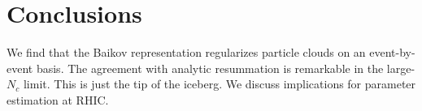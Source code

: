 \section{Conclusions}\label{sec:conclusions}

We find that the Baikov representation regularizes particle clouds on an
event-by-event basis. The agreement with analytic resummation is
remarkable in the large-$N_c$ limit. This is just the tip of the
iceberg. We discuss implications for parameter estimation at RHIC.

